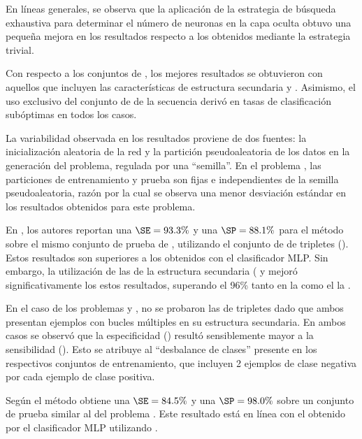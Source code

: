 
En líneas generales, se observa que la aplicación de la estrategia de
búsqueda exhaustiva para determinar el número de neuronas en la capa
oculta obtuvo una pequeña mejora en los resultados respecto a los
obtenidos mediante la estrategia trivial.

Con respecto a los conjuntos de , los mejores resultados se
obtuvieron con aquellos que incluyen las características de estructura
secundaria  y .
Asimismo, el uso exclusivo del conjunto de  de la secuencia
derivó en tasas de clasificación subóptimas en todos los casos.

La variabilidad observada en los resultados proviene de dos fuentes:
la inicialización aleatoria de la red y la partición pseudoaleatoria de
los datos en la generación del problema, regulada por una ``semilla''.
En el problema \prob\tripletsvm{}, las particiones de entrenamiento y
prueba son fijas e independientes de la semilla pseudoaleatoria,
razón por la cual se observa una menor desviación estándar en los
resultados obtenidos para este problema.

En \cite{xue}, los autores reportan una $\SE=93.3\%$ y una
$\SP=88.1\%$ para el método \work\tripletsvm{} sobre el mismo conjunto
de prueba de \prob\tripletsvm{}, utilizando el conjunto de 
de tripletes ().
Estos resultados son superiores a los obtenidos con el clasificador
MLP.
Sin embargo, la utilización de las  de la estructura
secundaria ( y  mejoró significativamente los estos
resultados, superando el 96\% tanto en la \SE{} como el la \SP.

En el caso de los problemas \prob\mipred{} y \prob\micropred{}, no se
probaron las  de tripletes dado que ambos presentan ejemplos
con bucles múltiples en su estructura secundaria.
En ambos casos se observó que la especificidad (\SP) resultó
sensiblemente mayor a la sensibilidad (\SE).
Esto se atribuye al ``desbalance de clases'' presente en los
respectivos conjuntos de entrenamiento, que incluyen 2 ejemplos de
clase negativa por cada ejemplo de clase positiva.

Según \cite{ng} el método \work{\mipred} obtiene una $\SE=84.5\%$ y
una $\SP=98.0\%$ sobre un conjunto de prueba similar al del problema
\prob\mipred{}.
Este resultado está en línea con el obtenido por el clasificador MLP
utilizando  .


